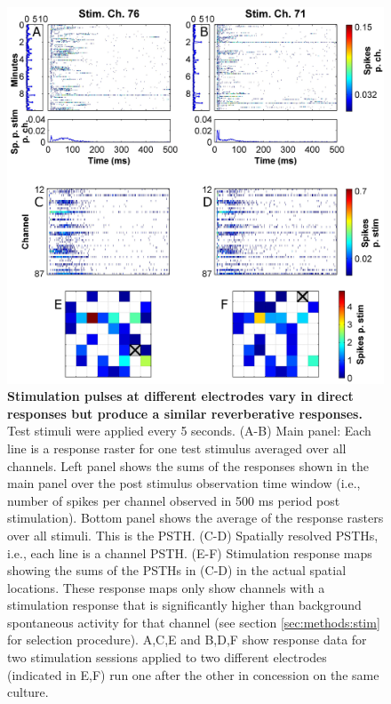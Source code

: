         \begin{figure}[!htb]
            \centering
            \includegraphics[width=15cm]{chapter3/figures/stimExample/stimExample.jpg}

            \caption[Example of responses to test stimuli applied at 2 different electrodes]{\textbf{Stimulation pulses at different electrodes vary in direct responses but produce a similar reverberative responses.} Test stimuli were applied every 5 seconds. (A-B) Main panel: Each line is a response raster for one test stimulus averaged over all channels. Left panel shows the sums of the responses shown in the main panel over the post stimulus observation time window (i.e., number of spikes per channel observed in 500 ms period post stimulation). Bottom panel shows the average of the response rasters over all stimuli. This is the PSTH. (C-D) Spatially resolved PSTHs, i.e., each line is a channel PSTH. (E-F) Stimulation response maps showing the sums of the PSTHs in (C-D) in the actual spatial locations. These response maps only show channels with a stimulation response that is significantly higher than background spontaneous activity for that channel (see section \ref{sec:methods:stim} for selection procedure). A,C,E and B,D,F show response data for two stimulation sessions applied to two different electrodes (indicated in E,F) run one after the other in concession on the same culture.}
            \label{fig:activity:stimExample}
        \end{figure}

